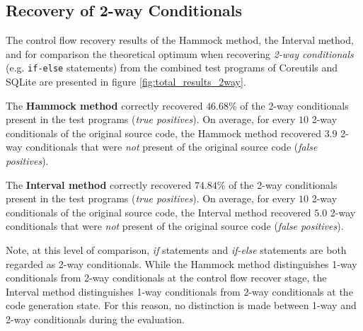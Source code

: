 
\subsection{Recovery of 2-way Conditionals}
\label{sec:recovery_of_2way_conditionals}

The control flow recovery results of the Hammock method, the Interval method, and for comparison the theoretical optimum when recovering \textit{2-way conditionals} (e.g. \texttt{if-else} statements) from the combined test programs of Coreutils and SQLite are presented in figure \ref{fig:total_results_2way}.

The \textbf{Hammock method} correctly recovered $46.68\%$ of the 2-way conditionals present in the test programs (\textit{true positives}). On average, for every $10$ 2-way conditionals of the original source code, the Hammock method recovered $3.9$ 2-way conditionals that were \textit{not} present of the original source code (\textit{false positives}).

The \textbf{Interval method} correctly recovered $74.84\%$ of the 2-way conditionals present in the test programs (\textit{true positives}). On average, for every $10$ 2-way conditionals of the original source code, the Interval method recovered $5.0$ 2-way conditionals that were \textit{not} present of the original source code (\textit{false positives}).

Note, at this level of comparison, \textit{if} statements and \textit{if-else} statements are both regarded as 2-way conditionals. While the Hammock method distinguishes 1-way conditionals from 2-way conditionals at the control flow recover stage, the Interval method distinguishes 1-way conditionals from 2-way conditionals at the code generation state. For this reason, no distinction is made between 1-way and 2-way conditionals during the evaluation.

